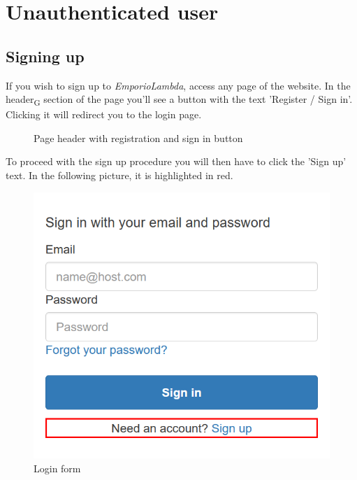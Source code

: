 \section{Unauthenticated user}
\subsection{Signing up}
If you wish to sign up to \textit{EmporioLambda}, access any page of the website. In the header\textsubscript{G} section of the page you'll see a button with the text 'Register / Sign in'. Clicking it will redirect you to the login page.

\begin{figure}[H]
%
\caption{Page header with registration and sign in button}
\end{figure}

To proceed with the sign up procedure you will then have to click the 'Sign up' text. In the following picture, it is highlighted in red.

\begin{figure}[H]
\centering
\includegraphics[scale=0.6]{res/Immagini/RegisterSigninForm}
\caption{Login form}
\end{figure}

